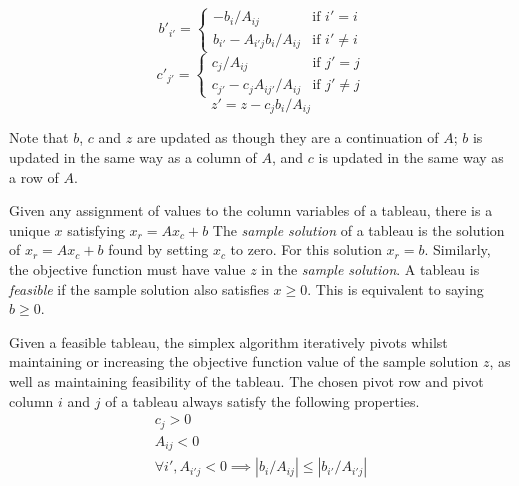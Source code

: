\documentclass[11pt]{article} %
\begin{document}
\begin{equation}\label{eqn:pivot_const}
  b'_{i'} = \begin{cases}
    -b_i/A_{ij} & \text{if } i' = i \\
    b_{i'} - A_{i'j}b_i/A_{ij} & \text{if } i' \ne i
  \end{cases}
\end{equation}
\begin{equation}
  c'_{j'} = \begin{cases}
    c_j/A_{ij} & \text{if } j' = j \\
    c_{j'} - c_jA_{ij'}/A_{ij} & \text{if } j' \ne j
  \end{cases}
\end{equation}
\begin{equation}\label{eqn:pivot_obj}
  z' = z - c_jb_i/A_{ij}
\end{equation}

Note that $b$, $c$ and $z$ are updated as though they are a continuation of $A$; $b$ is updated in the same way as a column of $A$, and $c$ is updated in the same way as a row of $A$.

Given any assignment of values to the column variables of a tableau, there is a unique $x$ satisfying $x_r=Ax_c+b$ The \textit{sample solution} of a tableau is the solution of $x_r = Ax_c+b$ found by setting $x_c$ to zero. For this solution $x_r=b$. Similarly, the objective function must have value $z$ in the \textit{sample solution}. A tableau is \textit{feasible} if the sample solution also satisfies $x \ge 0$. This is equivalent to saying $b \ge 0$.

Given a feasible tableau, the simplex algorithm iteratively pivots whilst maintaining or increasing the objective function value of the sample solution $z$, as well as maintaining feasibility of the tableau. The chosen pivot row and pivot column $i$ and $j$ of a tableau always satisfy the following properties.
\begin{equation}\label{eqn:valid_pivot}
  \begin{aligned}
    c_j > 0 \\
    A_{ij} < 0 \\
    \forall i', A_{i'j} < 0 \implies \left|b_i/A_{ij}\right| \le \left|b_{i'} / A_{i'j}\right|
  \end{aligned}
\end{equation}
\end{document}
